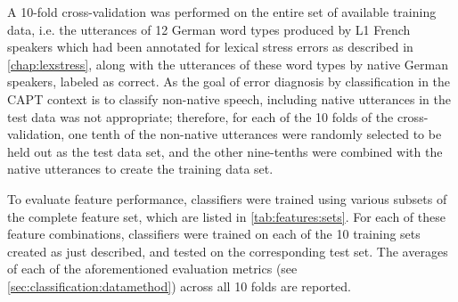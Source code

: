 		A 10-fold cross-validation was performed on the entire set of available training data, i.e. the utterances of 12 German word types produced by L1 French speakers which had been annotated for lexical stress errors as described in \cref{chap:lexstress}, along with the	utterances of these word types by native German speakers, labeled as correct. As the goal of  error diagnosis by classification in the CAPT context is to classify non-native speech, including native utterances in the test data was not appropriate; therefore, for each of the 10 folds of the cross-validation, one tenth of the non-native utterances were randomly selected to be held out as the test data set, and the other nine-tenths were combined with the native utterances to create the training data set. 
		
		To evaluate feature performance, classifiers were trained using various subsets of the complete feature set,
		which are listed in \cref{tab:features:sets}. For each of these feature combinations, classifiers were trained on each of the 10 training sets created as just described, and tested on the corresponding test set. The averages of each of the aforementioned evaluation metrics (see \cref{sec:classification:datamethod}) across all 10 folds are reported.

